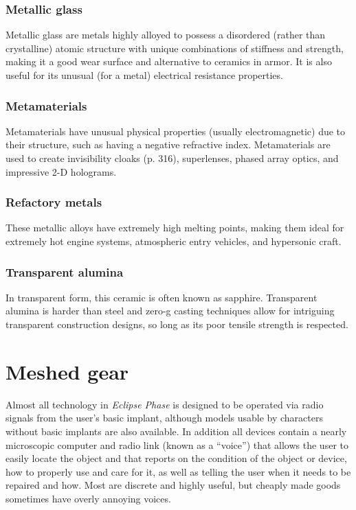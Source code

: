 \subsubsection{Metallic glass}

Metallic glass are metals highly alloyed to possess a
disordered (rather than crystalline) atomic structure
with unique combinations of stiffness and strength,
making it a good wear surface and alternative to
ceramics in armor. It is also useful for its unusual
(for a metal) electrical resistance properties.

\subsubsection{Metamaterials}

Metamaterials have unusual physical properties
(usually electromagnetic) due to their structure,
such as having a negative refractive index. Metamaterials
are used to create invisibility cloaks (p. 316),
superlenses, phased array optics, and impressive
2-D holograms.

\subsubsection{Refactory metals}

These metallic alloys have extremely high melting
points, making them ideal for extremely hot
engine systems, atmospheric entry vehicles, and
hypersonic craft.

\subsubsection{Transparent alumina}

In transparent form, this ceramic is often known as
sapphire. Transparent alumina is harder than steel
and zero-g casting techniques allow for intriguing
transparent construction designs, so long as its poor
tensile strength is respected.


\section{Meshed gear}
\label{sec:meshed-gear}

Almost all technology in \emph{Eclipse Phase} is designed
to be operated via radio signals from the user’s basic
implant, although models usable by characters without
basic implants are also available. In addition all
devices contain a nearly microscopic computer and
radio link (known as a “voice”) that allows the user to
easily locate the object and that reports on the condition
of the object or device, how to properly use and
care for it, as well as telling the user when it needs
to be repaired and how. Most are discrete and highly
useful, but cheaply made goods sometimes have overly
annoying voices.

